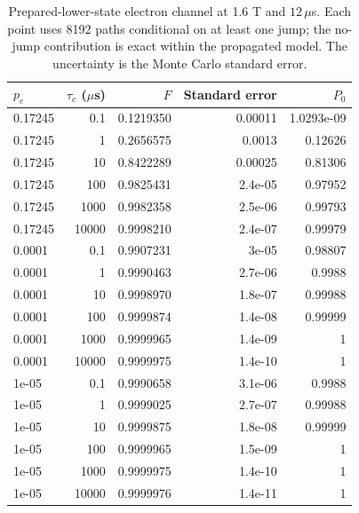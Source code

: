 \begin{table}[htbp]
\centering
\small
\setlength{\tabcolsep}{4pt}
\caption{Prepared-lower-state electron channel at 1.6 T and $12\,\mu$s. Each point uses 8192 paths conditional on at least one jump; the no-jump contribution is exact within the propagated model. The uncertainty is the Monte Carlo standard error.}\label{tab:noise}
\begin{tabular}{lrrrr}
\toprule
$p_e$ & $\tau_c$ ($\mu$s) & $F$ & Standard error & $P_0$ \\
\midrule
0.17245 & 0.1 & 0.1219350 & 0.00011 & 1.0293e-09 \\
0.17245 & 1 & 0.2656575 & 0.0013 & 0.12626 \\
0.17245 & 10 & 0.8422289 & 0.00025 & 0.81306 \\
0.17245 & 100 & 0.9825431 & 2.4e-05 & 0.97952 \\
0.17245 & 1000 & 0.9982358 & 2.5e-06 & 0.99793 \\
0.17245 & 10000 & 0.9998210 & 2.4e-07 & 0.99979 \\
0.0001 & 0.1 & 0.9907231 & 3e-05 & 0.98807 \\
0.0001 & 1 & 0.9990463 & 2.7e-06 & 0.9988 \\
0.0001 & 10 & 0.9998970 & 1.8e-07 & 0.99988 \\
0.0001 & 100 & 0.9999874 & 1.4e-08 & 0.99999 \\
0.0001 & 1000 & 0.9999965 & 1.4e-09 & 1 \\
0.0001 & 10000 & 0.9999975 & 1.4e-10 & 1 \\
1e-05 & 0.1 & 0.9990658 & 3.1e-06 & 0.9988 \\
1e-05 & 1 & 0.9999025 & 2.7e-07 & 0.99988 \\
1e-05 & 10 & 0.9999875 & 1.8e-08 & 0.99999 \\
1e-05 & 100 & 0.9999965 & 1.5e-09 & 1 \\
1e-05 & 1000 & 0.9999975 & 1.4e-10 & 1 \\
1e-05 & 10000 & 0.9999976 & 1.4e-11 & 1 \\
\bottomrule
\end{tabular}
\end{table}
